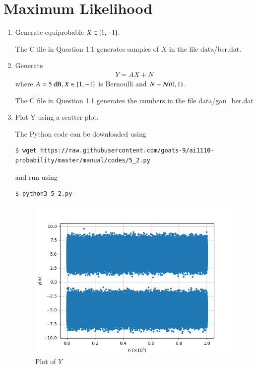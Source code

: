 \documentclass[journal,12pt,twocolumn]{IEEEtran}
\renewcommand\thesection{\arabic{section}}
\begin{document}
\section{Maximum Likelihood}
\begin{enumerate}[label=\thesection.\arabic*
,ref=\thesection.\theenumi]
\item Generate equiprobable $X \in \left\{1, -1\right\}$.

\solution
The C file in Question 1.1 generates samples of $X$ in the file data/ber.dat.

\item Generate 
	\begin{align}
		Y = AX + N
	\end{align}
where $A  = 5 \text{ dB}, X \in \left\{1, -1\right\}$ is Bernoulli and $N \sim \mathcal{N}(0, 1)$.

\solution
The C file in Question 1.1 generates the numbers in the file data/gau\_ber.dat
\item Plot Y using a scatter plot.

\solution
The Python code can be downloaded using
\begin{lstlisting}
$ wget https://raw.githubusercontent.com/goats-9/ai1110-probability/master/manual/codes/5_2.py
\end{lstlisting}
and run using
\begin{lstlisting}
$ python3 5_2.py
\end{lstlisting}
\begin{figure}[!htb]
	\includegraphics[width=\columnwidth]{figs/5_2.png}
	\caption{Plot of $Y$}
	\label{fig:wave}
\end{figure}


\end{enumerate}
\end{document}
